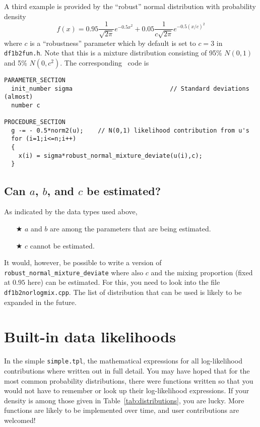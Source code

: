 \documentclass{admbmanual}
\begin{document}
A third example is provided by the ``robust'' normal distribution with
probability density
\begin{equation*}
  f(x) = 0.95\frac{1}{\sqrt{2\pi}}e^{-0.5x^2}
  + 0.05\frac{1}{c\sqrt{2\pi}}e^{-0.5(x/c)^2}
\end{equation*}
where $c$ is a ``robustness'' parameter which by default is set to $c=3$ in
\texttt{df1b2fun.h}. Note that this is a mixture distribution consisting of 95\%
$N(0,1)$ and 5\% $N(0,c^2)$. The corresponding \scAR\ code is
\begin{lstlisting}
PARAMETER_SECTION
  init_number sigma                           // Standard deviations (almost)
  number c

PROCEDURE_SECTION
  g -= - 0.5*norm2(u);    // N(0,1) likelihood contribution from u's
  for (i=1;i<=n;i++)
  {
    x(i) = sigma*robust_normal_mixture_deviate(u(i),c);
  }
\end{lstlisting}

\subsection{Can $a$, $b$, and $c$ be estimated?}

As indicated by the data types used above,
\begin{itemize}
  \item[$\bigstar$]
  $a$ and $b$ are among the parameters that are being estimated.
  \item[$\bigstar$]
  $c$ cannot be estimated.
\end{itemize}
It would, however, be possible to write a version of
\texttt{robust\_normal\_mixture\_deviate} where also $c$ and the mixing
proportion (fixed at $0.95$ here) can be estimated. For this, you need to look
into the file \texttt{df1b2norlogmix.cpp}. The list of distribution that can be
used is likely to be expanded in the future.

\section{Built-in data likelihoods}

In the simple \texttt{simple.tpl}, the mathematical expressions for all
log-likelihood contributions where written out in full detail. You may have
hoped that for the most common probability distributions, there were functions
written so that you would not have to remember or look up their log-likelihood
expressions. If your density is among those given in
Table~\ref{tab:distributions}, you are lucky. More functions are likely to be
implemented over time, and user contributions are welcomed!
\end{document}
